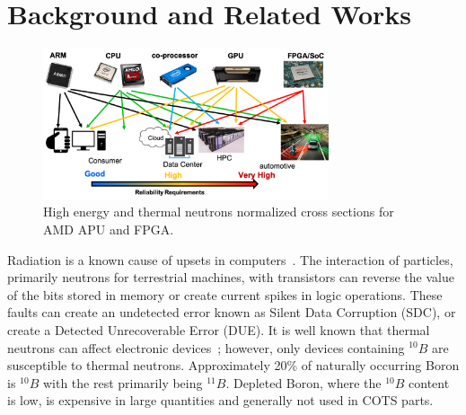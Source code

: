\section{Background and Related Works}
\label{sec_background}

\begin{figure}[th]
	\centering
	\includegraphics[width=0.75\textwidth]{./figs/motivation.png}
	\caption{High energy and thermal neutrons normalized cross sections for AMD APU and FPGA.}
	\label{motivation}
\end{figure}

%

Radiation is a known cause of upsets in computers~\cite{Jedec2006}. The interaction of particles, primarily neutrons for terrestrial machines, with transistors can reverse the value of the bits stored in memory or create current spikes in logic operations. These faults can create an undetected error known as Silent Data Corruption (SDC), or create a Detected Unrecoverable Error (DUE). It is well known that thermal neutrons can affect electronic devices~\cite{Baumann2005, ziegler2003}; however, only devices containing $^{10}B$ are susceptible to thermal neutrons. 
Approximately 20\% of naturally occurring Boron is $^{10}B$ with the rest primarily being $^{11}B$. Depleted Boron, where the $^{10}B$ content is low, is expensive in large quantities and generally not used in COTS parts. %

